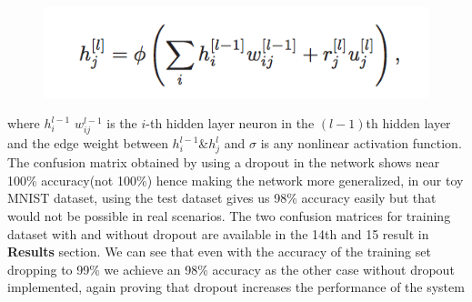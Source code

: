 \documentclass[conference]{IEEEtran}
\begin{document}
\begin{figure}[h!]
\centering
\includegraphics[scale=0.5]{dropoutEquation}
\end{figure}
where $h_{i}^{l-1}$ $w_{ij}^{l-1}$ is the $i$-th hidden layer neuron in the $(l-1)$th hidden layer and the edge weight between $h_{i}^{l-1}$\&$h_{j}^{l}$ and $\sigma$ is any nonlinear activation function. The confusion matrix obtained by using a dropout in the network shows near 100\% accuracy(not 100\%) hence making the network more generalized, in our toy MNIST dataset, using the test dataset gives us 98\% accuracy easily but that would not be possible in real scenarios. The two confusion matrices for training dataset with and without dropout are available in the 14th and 15 result in \textbf{Results} section. We can see that even with the accuracy of the training set dropping to 99\% we achieve an 98\% accuracy as the other case without dropout implemented, again proving that dropout increases the performance of the system 
\end{document}
